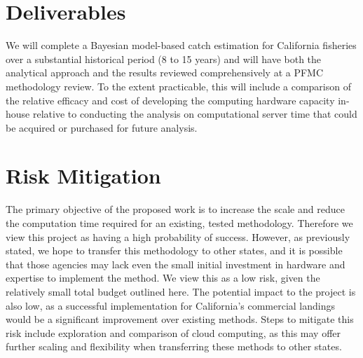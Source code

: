 \documentclass[12pt]{article}
\begin{document}

%
\section{Deliverables}\label{deliverables}
%
We will complete a Bayesian model-based catch estimation for California fisheries over a substantial historical period (8 to 15 years) and will have both the analytical approach and the results reviewed comprehensively at a PFMC methodology review.  
To the extent practicable, this will include a comparison of the relative efficacy and cost of developing the computing hardware capacity in-house relative to conducting the analysis on computational server time that could be acquired or purchased for future analysis.

%
\section{Risk Mitigation}
%


%
The primary objective of the proposed work is to increase the scale and reduce the computation time required for an existing, tested methodology. 
Therefore we view this project as having a high probability of success. 
However, as previously stated, we hope to transfer this methodology to other states, and it is possible that those agencies may lack even the small initial investment in hardware and expertise to implement the method. 
We view this as a low risk, given the relatively small total budget outlined here. 
The potential impact to the project is also low, as a successful implementation for California's commercial landings would be a significant improvement over existing methods. 
Steps to mitigate this risk include exploration and comparison of cloud computing, as this may offer further scaling and flexibility when transferring these methods to other states.
\end{document}
